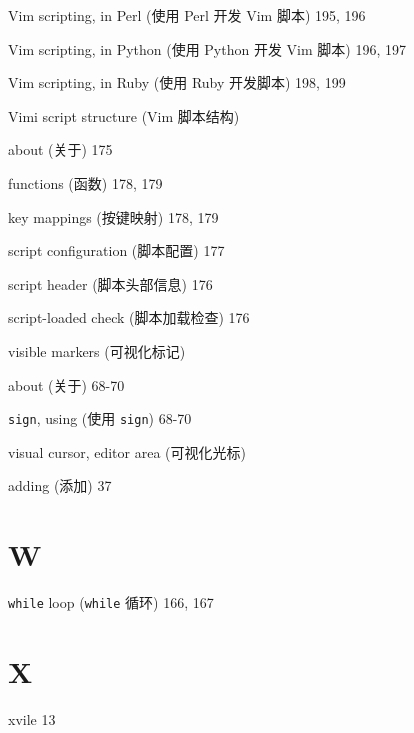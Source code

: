 \begin{multicols}{2}
Vim scripting, in Perl (使用 Perl 开发 Vim 脚本) 195, 196

Vim scripting, in Python (使用 Python 开发 Vim 脚本) 196, 197

Vim scripting, in Ruby (使用 Ruby 开发脚本) 198, 199

Vimi script structure (Vim 脚本结构) \par
  about (关于) 175 \par
  functions (函数) 178, 179 \par
  key mappings (按键映射) 178, 179 \par
  script configuration (脚本配置) 177 \par
  script header (脚本头部信息) 176 \par
  script-loaded check (脚本加载检查) 176 \par

visible markers (可视化标记) \par
  about (关于) 68-70 \par
  \texttt{sign}, using (使用 \texttt{sign}) 68-70 \par

visual cursor, editor area (可视化光标) \par
  adding (添加) 37 \par

\section*{W}

\texttt{while} loop (\texttt{while} 循环) 166, 167

\section*{X}

xvile 13

\end{multicols}
